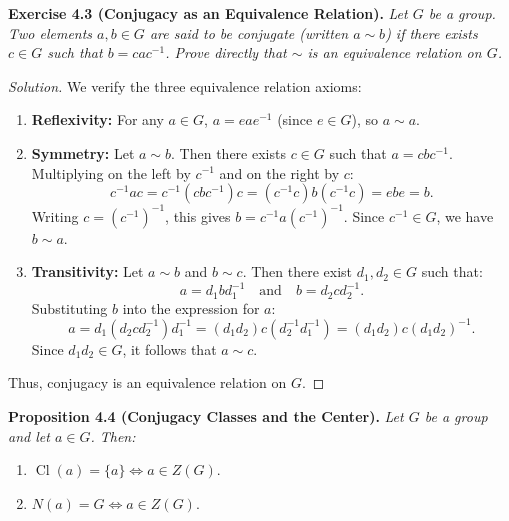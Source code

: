 \documentclass[11pt,a4paper]{article}
\DeclareMathOperator{\Cl}{Cl}
\begin{document}
\begin{probbox}
\textbf{Exercise 4.3 (Conjugacy as an Equivalence Relation).} \textit{Let $G$ be a group. Two elements $a, b \in G$ are said to be conjugate (written $a \sim b$) if there exists $c \in G$ such that $b = c a c^{-1}$. Prove directly that $\sim$ is an equivalence relation on $G$.}
\end{probbox}

\begin{proof}[Solution]
We verify the three equivalence relation axioms:
\begin{enumerate}[label=\textbf{\arabic*)}]
    \item \textbf{Reflexivity:} For any $a \in G$, $a = e a e^{-1}$ (since $e \in G$), so $a \sim a$.
    \item \textbf{Symmetry:} Let $a \sim b$. Then there exists $c \in G$ such that $a = c b c^{-1}$. Multiplying on the left by $c^{-1}$ and on the right by $c$:
    \[
    c^{-1} a c = c^{-1}(c b c^{-1})c = (c^{-1} c) b (c^{-1} c) = e b e = b.
    \]
    Writing $c = (c^{-1})^{-1}$, this gives $b = c^{-1} a (c^{-1})^{-1}$. Since $c^{-1} \in G$, we have $b \sim a$.
    \item \textbf{Transitivity:} Let $a \sim b$ and $b \sim c$. Then there exist $d_1, d_2 \in G$ such that:
    \[
    a = d_1 b d_1^{-1} \quad \text{and} \quad b = d_2 c d_2^{-1}.
    \]
    Substituting $b$ into the expression for $a$:
    \[
    a = d_1 (d_2 c d_2^{-1}) d_1^{-1} = (d_1 d_2) c (d_2^{-1} d_1^{-1}) = (d_1 d_2) c (d_1 d_2)^{-1}.
    \]
    Since $d_1 d_2 \in G$, it follows that $a \sim c$.
\end{enumerate}
Thus, conjugacy is an equivalence relation on $G$.
\end{proof}

\begin{thmbox}
\textbf{Proposition 4.4 (Conjugacy Classes and the Center).} \textit{Let $G$ be a group and let $a \in G$. Then:}
\begin{enumerate}[label=\textbf{\arabic*)}]
    \item $\Cl(a) = \{a\} \iff a \in Z(G)$.
    \item $N(a) = G \iff a \in Z(G)$.
\end{enumerate}
\end{thmbox}
\end{document}
